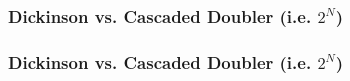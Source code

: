 \documentclass[aspectratio=169]{beamer}
\begin{document}
\begin{frame}
    \frametitle{Dickinson vs. Cascaded Doubler (i.e. $2^N$)}

\end{frame}

\begin{frame}
    \frametitle{Dickinson vs. Cascaded Doubler (i.e. $2^N$)}

\end{frame}
\end{document}
